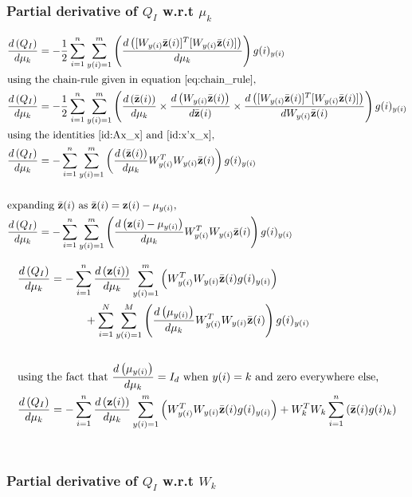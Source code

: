 \documentclass[]{article}
\begin{document}
\subsubsection*{Partial derivative of $Q_I$ w.r.t $\mu_k$}

\begin{align*}
&\der{\mu_k}{Q_I}  = -\frac{1}{2}\sum\limits_{i=1}^n \sum\limits_{y(i)=1}^m \left( \der{\mu_k}{ [W_{y(i)}\zbar{i}]^T [W_{y(i)}\zbar{i}] }\right)g(i)_{y(i)} \\
&\text{using the chain-rule given in equation \ref{eq:chain_rule},}  \\
&\der{\mu_k}{Q_I} = -\frac{1}{2}\sum\limits_{i=1}^n \sum\limits_{y(i)=1}^m \left( \der{\mu_k}{\zbar{i}} \times \der{\zbar{i}}{W_{y(i)}\zbar{i}} \times \der{W_{y(i)}\zbar{i}} { [W_{y(i)}\zbar{i}]^T [W_{y(i)}\zbar{i}] } \right) g(i)_{y(i)} \\
&\text{using the identities \ref{id:Ax_x} and \ref{id:x'x_x},} \\
&\der{\mu_k}{Q_I} = -\sum\limits_{i=1}^n \sum\limits_{y(i)=1}^m \left(\der{\mu_k}{\zbar{i}} W^T_{y(i)}W_{y(i)}\zbar{i}\right) g(i)_{y(i)} \\ \\
&\text{expanding } \zbar{i} \text{ as } \zbar{i}=\textbf{z}(i)-\mu_{y(i)}, \\
&\der{\mu_k}{Q_I} = -\sum\limits_{i=1}^n \sum\limits_{y(i)=1}^m \left(\der{\mu_k}{\textbf{z}(i)-\mu_{y(i)}} W^T_{y(i)}W_{y(i)}\zbar{i}\right) g(i)_{y(i)}
\end{align*}

\begin{align*}
&\der{\mu_k}{Q_I} = -\sum\limits_{i=1}^n \der{\mu_k}{\textbf{z}(i)} \sum\limits_{y(i)=1}^m \left(W^T_{y(i)}W_{y(i)}\zbar{i} g(i)_{y(i)} \right)  \\
& \qquad \qquad \qquad + \sum\limits_{i=1}^N \sum\limits_{y(i)=1}^M \left(\der{\mu_k}{\mu_{y(i)}} W^T_{y(i)}W_{y(i)}\zbar{i}\right) g(i)_{y(i)} \\ \\
&\text{using the fact that } \der{\mu_k}{\mu_{y(i)}}=I_d \text{ when } y(i)=k \text{ and zero everywhere else,} \\
&\der{\mu_k}{Q_I} = -\sum\limits_{i=1}^n \der{\mu_k}{\textbf{z}(i)} \sum\limits_{y(i)=1}^m \left(W^T_{y(i)}W_{y(i)}\zbar{i} g(i)_{y(i)} \right) + W^T_k W_k\sum\limits_{i=1}^n  \left(\zbar{i} g(i)_k\right)
\end{align*}
\\
\subsubsection*{Partial derivative of $Q_I$ w.r.t $W_k$}
\end{document}

